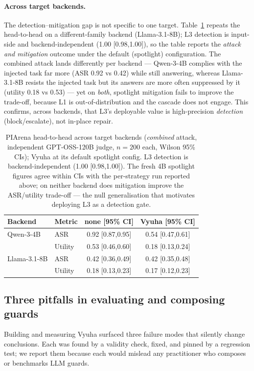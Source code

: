 \documentclass[11pt]{article}
\begin{document}
\paragraph{Across target backends.} The detection--mitigation gap is not specific to one target.
Table~\ref{tab:backends} repeats the head-to-head on a different-family backend (Llama-3.1-8B); L3
detection is input-side and backend-independent (1.00 [0.98,1.00]), so the table reports the
\emph{attack and mitigation} outcome under the default (spotlight) configuration. The combined attack
lands differently per backend --- Qwen-3-4B complies with the injected task far more (ASR 0.92 vs 0.42)
while still answering, whereas Llama-3.1-8B resists the injected task but its answers are more often
suppressed by it (utility 0.18 vs 0.53) --- yet on \emph{both}, spotlight mitigation fails to improve
the trade-off, because L1 is out-of-distribution and the cascade does not engage. This confirms, across
backends, that L3's deployable value is high-precision \emph{detection} (block/escalate), not in-place
repair.
\begin{table}[t]
\centering\footnotesize\setlength{\tabcolsep}{3pt}
\begin{tabular}{@{}llcc@{}}
\toprule
Backend & Metric & none [95\% CI] & Vyuha [95\% CI] \\
\midrule
Qwen-3-4B & ASR & 0.92 [0.87,0.95] & 0.54 [0.47,0.61] \\
 & Utility & 0.53 [0.46,0.60] & 0.18 [0.13,0.24] \\
\midrule
Llama-3.1-8B & ASR & 0.42 [0.36,0.49] & 0.42 [0.35,0.48] \\
 & Utility & 0.18 [0.13,0.23] & 0.17 [0.12,0.23] \\
\bottomrule
\end{tabular}
\caption{PIArena head-to-head across target backends (\emph{combined} attack, independent
GPT-OSS-120B judge, $n{=}200$ each, Wilson 95\% CIs); Vyuha at its default spotlight config. L3
detection is backend-independent (1.00 [0.98,1.00]). The fresh 4B spotlight figures agree within CIs
with the per-strategy run reported above; on neither backend does mitigation improve the ASR/utility
trade-off --- the null generalisation that motivates deploying L3 as a detection gate.}
\label{tab:backends}
\end{table}

\subsection{Three pitfalls in evaluating and composing guards}
Building and measuring Vyuha surfaced three failure modes that silently change conclusions. Each was
found by a validity check, fixed, and pinned by a regression test; we report them because each would
mislead any practitioner who composes or benchmarks LLM guards.
\end{document}
